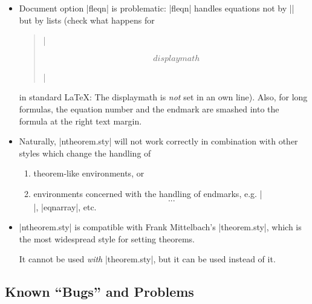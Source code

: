 \begin{itemize}
 \item Document option |fleqn| is problematic: |fleqn| handles
  equations not by |$$| but by lists (check what happens for
  \begin{quote}
  |\begin{theorem} \[ displaymath \] \end{theorem}| 
  \end{quote}
  in standard \LaTeX:
  The displaymath is \emph{not} set in an own line).
  Also, for long formulas, the equation number and the endmark are
  smashed into the formula at the right text margin.
 \item Naturally, |ntheorem.sty| will not work correctly in
  combination with other styles which change the handling
  of
  \begin{enumerate}
   \item theorem-like environments, or 
   \item environments concerned with the handling of endmarks, e.g.
     |\[...\]|, |eqnarray|, etc.
  \end{enumerate}
 \item |ntheorem.sty| is compatible with Frank Mittelbach's
  |theorem.sty|, which is the most widespread style for setting
  theorems.

  It cannot be used \emph{with} |theorem.sty|, but it can be
  used instead of it.
\end{itemize}

\subsection{Known ``Bugs'' and Problems}



